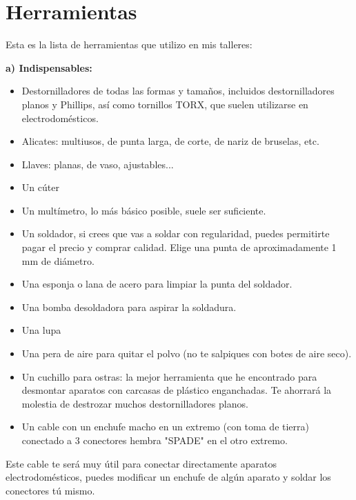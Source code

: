 \documentclass[a5paper,twoside,openany]{book}
\begin{document}
\section{Herramientas}
Esta es la lista de herramientas que utilizo en mis talleres:

{\large \textbf{a) Indispensables:}}
\begin{itemize}[label=\CheckmarkBold]
\setlength\itemsep{0em} %
\item Destornilladores de todas las formas y tamaños, incluidos destornilladores planos y Phillips, así como tornillos TORX, que suelen utilizarse en electrodomésticos. 
\item Alicates: multiusos, de punta larga, de corte, de nariz de bruselas, etc. 
\item Llaves: planas, de vaso, ajustables... 
\item Un cúter 
\item Un multímetro, lo más básico posible, suele ser suficiente.
\item Un soldador, si crees que vas a soldar con regularidad, puedes permitirte pagar el precio y comprar calidad. Elige una punta de aproximadamente 1 mm de diámetro. 
\item Una esponja o lana de acero para limpiar la punta del soldador.
\item Una bomba desoldadora para aspirar la soldadura.
\item Una lupa
\item Una pera de aire para quitar el polvo (no te salpiques con botes de aire seco).
\item Un cuchillo para ostras: la mejor herramienta que he encontrado para desmontar aparatos con carcasas de plástico enganchadas. Te ahorrará la molestia de destrozar muchos destornilladores planos.
\item Un cable con un enchufe macho en un extremo (con toma de tierra) conectado a 3 conectores hembra "SPADE" en el otro extremo.\\
\end{itemize}

Este cable te será muy útil para conectar directamente aparatos electrodomésticos, puedes modificar un enchufe de algún aparato y soldar los conectores tú mismo.
\end{document}
